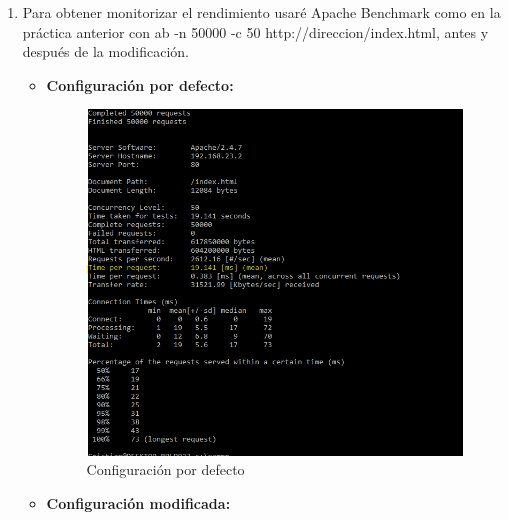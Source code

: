 \begin{enumerate}[label=(\alph*)]
\item Para obtener monitorizar el rendimiento usaré Apache Benchmark como en la práctica anterior con ab -n 50000 -c 50 http://direccion/index.html, antes y después de la modificación.

\begin{itemize}
	\item \textbf{Configuración por defecto:}
	
	\begin{figure}[H] %
		\centering
		\includegraphics[scale=0.5]{pics/111}  %
		\caption{Configuración por defecto} \label{fig:7}
	\end{figure}
	
	\item \textbf{Configuración modificada:}
	

\end{itemize}
\end{enumerate}
